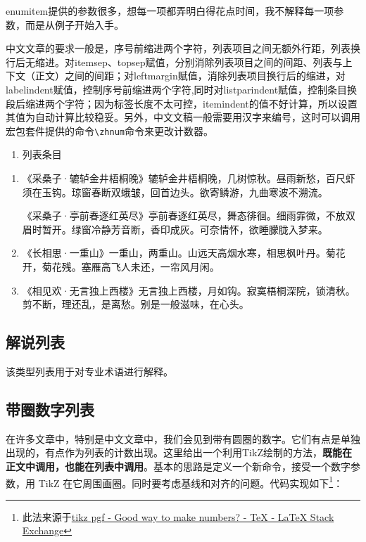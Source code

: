 enumitem提供的参数很多，想每一项都弄明白得花点时间，我不解释每一项参数，而是从例子开始入手。

中文文章的要求一般是，序号前缩进两个字符，列表项目之间无额外行距，列表换行后无缩进。对itemsep、topsep赋值，分别消除列表项目之间的间距、列表与上下文（正文）之间的间距；对leftmargin赋值，消除列表项目换行后的缩进，对labelindent赋值，控制序号前缩进两个字符,同时对listparindent赋值，控制条目换段后缩进两个字符；因为标签长度不太可控，itemindent的值不好计算，所以设置其值为自动计算比较稳妥。另外，中文文稿一般需要用汉字来编号，这时可以调用\CTeX{}宏包套件提供的命令\lstinline|\zhnum|命令来更改计数器。

\begin{latex}
\begin{enumerate}[label=(\zhnum*),itemsep=0pt,parsep=0pt,topsep=0pt,leftmargin=0pt,labelindent=\parindent,listparindent=\parindent,itemindent=*]
\item 列表条目
\end{enumerate}
\end{latex}

\begin{enumerate}[label=(\zhnum*),itemsep=0pt,parsep=0pt,topsep=0pt,leftmargin=0pt,labelindent=\parindent,listparindent=\parindent,itemindent=*]
\item 《采桑子·辘轳金井梧桐晚》辘轳金井梧桐晚，几树惊秋。昼雨新愁，百尺虾须在玉钩。琼窗春断双蛾皱，回首边头。欲寄鳞游，九曲寒波不溯流。\par
《采桑子·亭前春逐红英尽》亭前春逐红英尽，舞态徘徊。细雨霏微，不放双眉时暂开。绿窗冷静芳音断，香印成灰。可奈情怀，欲睡朦胧入梦来。
\item 《长相思·一重山》一重山，两重山。山远天高烟水寒，相思枫叶丹。菊花开，菊花残。塞雁高飞人未还，一帘风月闲。 
\item 《相见欢·无言独上西楼》无言独上西楼，月如钩。寂寞梧桐深院，锁清秋。剪不断，理还乱，是离愁。别是一般滋味，在心头。
\end{enumerate}

\subsection{解说列表}
该类型列表用于对专业术语进行解释。

\subsection{带圈数字列表}

在许多文章中，特别是中文文章中，我们会见到带有圆圈的数字。它们有点是单独出现的，有点作为列表的计数出现。这里给出一个利用TikZ绘制的方法，\textbf{既能在正文中调用，也能在列表中调用}。基本的思路是定义一个新命令，接受一个数字参数，用 TikZ 在它周围画圈。同时要考虑基线和对齐的问题。代码实现如下\footnote{此法来源于\href{http://tex.stackexchange.com/questions/7032/good-way-to-make-textcircled-numbers}{tikz pgf - Good way to make  numbers? - TeX - LaTeX Stack Exchange}}：

